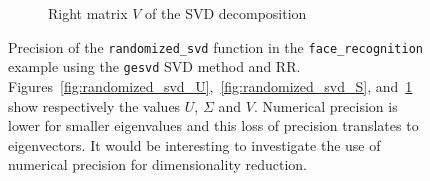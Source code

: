 \documentclass[11pt]{article}
\begin{document}
\begin{figure}
\begin{subfigure}{0.3\linewidth}
    \caption{Right matrix $V$ of the SVD decomposition}
    \label{fig:randomized_svd_V}
    \end{subfigure}
    \caption{Precision of the \texttt{randomized\_svd} function in the 
    \texttt{face\_recognition} example using the \texttt{gesvd} SVD method and RR.
    Figures~\ref{fig:randomized_svd_U},~\ref{fig:randomized_svd_S}, and~\ref{fig:randomized_svd_V}
    show respectively the values $U$, $\Sigma$ and $V$.
     Numerical precision is lower for smaller eigenvalues and this loss of precision translates to eigenvectors. It would be interesting to investigate the use of numerical precision for dimensionality reduction.
    }
    \label{fig:face_recognition_svd}
\end{figure}










\end{document}
